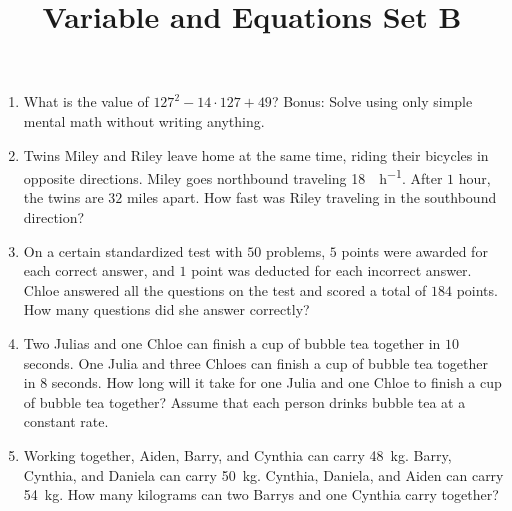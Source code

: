 \documentclass{article}
\title{Variable and Equations Set B}
\author{}
\date{}
\begin{document}
    \maketitle
    \begin{enumerate}
        \item What is the value of $127^2 - 14 \cdot 127 + 49$? Bonus: Solve using only simple mental math without writing anything.
        \vspace{3cm}
        \item Twins Miley and Riley leave home at the same time, riding their bicycles in opposite directions. Miley goes northbound traveling \SI{18}{\mile\per\hour}. After $1$ hour, the twins are $32$ miles apart. How fast was Riley traveling in the southbound direction?
        \vspace{3cm}
        \item On a certain standardized test with $50$ problems, $5$ points were awarded for each correct answer, and $1$ point was deducted for each incorrect answer. Chloe answered all the questions on the test and scored a total of $184$ points. How many questions did she answer correctly?
        \vspace{3cm}
        \item Two Julias and one Chloe can finish a cup of bubble tea together in $10$ seconds. One Julia and three Chloes can finish a cup of bubble tea together in $8$ seconds. How long will it take for one Julia and one Chloe to finish a cup of bubble tea together? Assume that each person drinks bubble tea at a constant rate.
        \vspace{3cm}
        \item Working together, Aiden, Barry, and Cynthia can carry \SI{48}{\kilogram}. Barry, Cynthia, and Daniela can carry \SI{50}{\kilogram}. Cynthia, Daniela, and Aiden can carry \SI{54}{\kilogram}. How many kilograms can two Barrys and one Cynthia carry together?
        \vspace{3cm}
    \end{enumerate}
\end{document}
